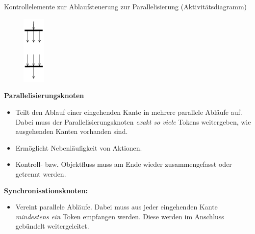\begin{defi}{Kontrollelemente zur Ablaufsteuerung zur Parallelisierung (Aktivitätsdiagramm)}
    \begin{figure}
        \centering
        \includegraphics[width=0.1\textwidth]{includes/figures/defi_diagrams_activity_and.pdf}
    \end{figure}
    \textbf{Parallelisierungsknoten}
    \begin{itemize}
        \item Teilt den Ablauf einer eingehenden Kante in mehrere parallele Abläufe auf.
              Dabei muss der Parallelisierungsknoten \emph{exakt so viele} Tokens weitergeben, wie ausgehenden Kanten vorhanden sind.
        \item Ermöglicht Nebenläufigkeit von Aktionen.
        \item Kontroll- bzw. Objektfluss muss am Ende wieder zusammengefasst oder getrennt werden.
    \end{itemize}

    \textbf{Synchronisationsknoten:}
    \begin{itemize}
        \item Vereint parallele Abläufe.
              Dabei muss aus jeder eingehenden Kante \emph{mindestens ein} Token empfangen werden.
              Diese werden im Anschluss gebündelt weitergeleitet.
    \end{itemize}
\end{defi}

